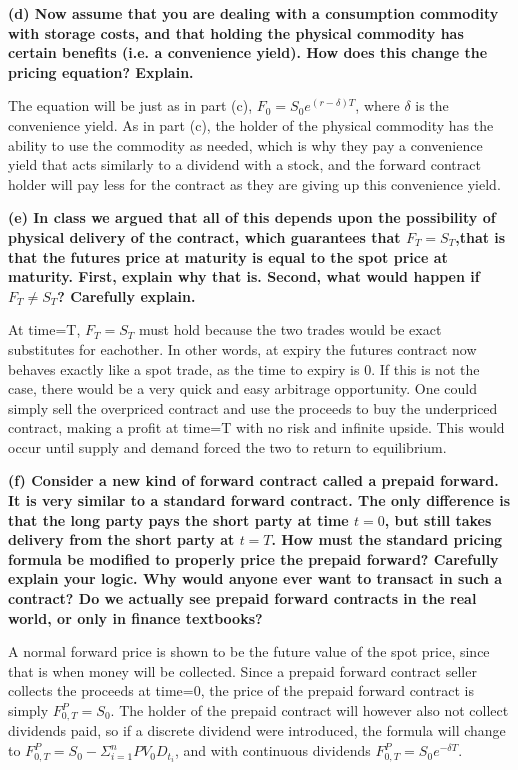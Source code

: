 \documentclass[11pt]{article}
\begin{document}
    \textbf{(d) Now assume that you are dealing with a consumption commodity
with storage costs, and that holding the physical commodity has certain
benefits (i.e. a convenience yield). How does this change the pricing
equation? Explain.}

    The equation will be just as in part (c), \(F_0=S_0e^{(r- \delta) T}\),
where \(\delta\) is the convenience yield. As in part (c), the holder of
the physical commodity has the ability to use the commodity as needed,
which is why they pay a convenience yield that acts similarly to a
dividend with a stock, and the forward contract holder will pay less for
the contract as they are giving up this convenience yield.

    \textbf{(e) In class we argued that all of this depends upon the
possibility of physical delivery of the contract, which guarantees that
\(F_T=S_T\),that is that the futures price at maturity is equal to the
spot price at maturity. First, explain why that is. Second, what would
happen if \(F_T \neq S_T\)? Carefully explain.}

    At time=T, \(F_T=S_T\) must hold because the two trades would be exact
substitutes for eachother. In other words, at expiry the futures
contract now behaves exactly like a spot trade, as the time to expiry is
0. If this is not the case, there would be a very quick and easy
arbitrage opportunity. One could simply sell the overpriced contract and
use the proceeds to buy the underpriced contract, making a profit at
time=T with no risk and infinite upside. This would occur until supply
and demand forced the two to return to equilibrium.

    \textbf{(f) Consider a new kind of forward contract called a prepaid
forward. It is very similar to a standard forward contract. The only
difference is that the long party pays the short party at time \(t=0\),
but still takes delivery from the short party at \(t=T\). How must the
standard pricing formula be modified to properly price the prepaid
forward? Carefully explain your logic. Why would anyone ever want to
transact in such a contract? Do we actually see prepaid forward
contracts in the real world, or only in finance textbooks?}

    A normal forward price is shown to be the future value of the spot
price, since that is when money will be collected. Since a prepaid
forward contract seller collects the proceeds at time=0, the price of
the prepaid forward contract is simply \(F^P_{0,T}=S_0\). The holder of
the prepaid contract will however also not collect dividends paid, so if
a discrete dividend were introduced, the formula will change to
\(F^P_{0,T}=S_0 - \Sigma^n_{i=1} PV_0 D_{t_i}\), and with continuous
dividends \(F^P_{0,T}=S_0e^{-\delta T}\).
\end{document}
